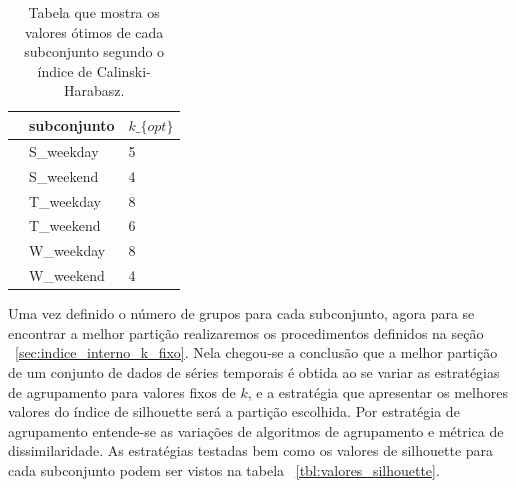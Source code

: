 \begin{center}
	\begin{table}
		\caption{Tabela que mostra os valores ótimos de cada subconjunto segundo o índice de Calinski-Harabasz.} 		
\begin{tabular}{lll}
 	\toprule
 	{} &    subconjunto & $k\_\{opt\}$ \\
 	\midrule
 	 &  S\_weekday &       5 \\
 	 &  S\_weekend &       4 \\
 	 &  T\_weekday &       8 \\
 	 &  T\_weekend &       6 \\
 	 &  W\_weekday &       8 \\
 	 &  W\_weekend &       4 \\
 	\bottomrule
\end{tabular}	
	\end{table}\label{tbl:valores_otimos_k}
\end{center} 	

Uma vez definido o número de grupos para cada subconjunto, agora para se encontrar a melhor partição realizaremos os procedimentos definidos na seção ~\ref{sec:indice_interno_k_fixo}. Nela chegou-se a conclusão que a melhor partição de um conjunto de dados de séries temporais é obtida ao se variar as estratégias de agrupamento para valores fixos de $k$, e a estratégia que apresentar os melhores valores do índice de silhouette será a partição escolhida. Por estratégia de agrupamento entende-se as variações de algoritmos de agrupamento e métrica de dissimilaridade. As estratégias testadas bem como os valores de silhouette para cada subconjunto podem ser vistos  na tabela ~\ref{tbl:valores_silhouette}.

